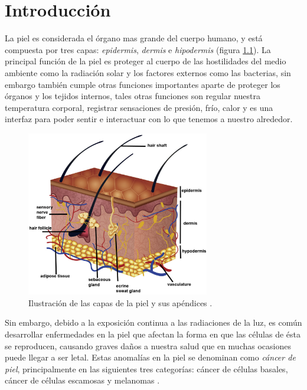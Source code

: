 
\chapter{Introducción}

La piel es considerada el órgano mas grande del cuerpo humano,  y está compuesta por tres capas: \emph{\gls{epidermis}}, \emph{\gls{dermis}} e \emph{\gls{hipodermis}} (figura \ref{fig:skin1_jpg}). La principal función de la piel es proteger al cuerpo de las hostilidades del medio ambiente como la radiación solar y los factores externos como las bacterias, sin embargo también cumple otras funciones importantes aparte de proteger los órganos y los tejidos internos, tales otras funciones son regular nuestra temperatura corporal, registrar sensaciones de presión, frío, calor y es una interfaz para poder sentir e interactuar con lo que tenemos a nuestro alrededor.

\begin{figure}[h!]
    \includegraphics[width=80mm, scale = 0.5]{Figuras/skin_structure1.jpg}
    \centering
    \caption{Ilustración de las capas de la piel y sus apéndices \citep{skin_1}.}
    \label{fig:skin1_jpg}
\end{figure}

Sin embargo, debido a la exposición continua a las radiaciones de la luz, es común desarrollar enfermedades en la piel que afectan la forma en que las células de ésta se reproducen, causando graves daños a nuestra salud que en muchas ocasiones puede llegar a ser letal. Estas anomalías en la piel se denominan como \emph{cáncer de piel}, principalmente en las siguientes tres categorías: cáncer de células basales, cáncer de células escamosas y melanomas \citep{cancer_org}.

